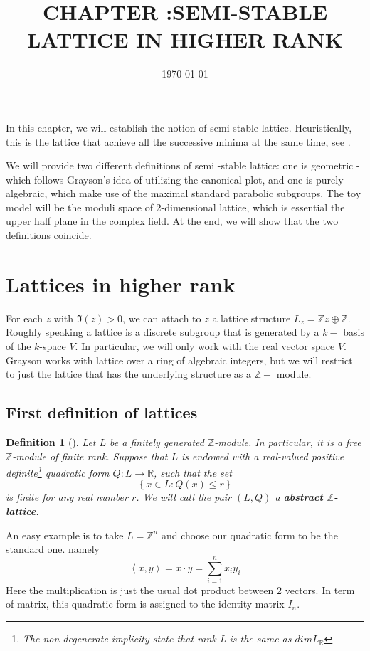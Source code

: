 \documentclass[12pt]{article} %
\title{CHAPTER  :SEMI-STABLE LATTICE IN HIGHER RANK} %
\date{\today} %
\newtheorem{definition}{Definition}[section]
\newcommand{\tpoint}[1]{\subsection{#1}}
\begin{document}
\maketitle %
In this chapter, we will establish the notion of semi-stable lattice. Heuristically,
this is the lattice that achieve all the successive minima at the same time, see \cite{}.

We will provide two different definitions of semi -stable lattice: one is geometric - which follows Grayson's idea of utilizing
the canonical plot, and one is purely algebraic, which make use of the maximal standard parabolic subgroups.
The toy model will be the moduli space of 2-dimensional lattice, which is essential the upper half plane in the complex field.
At the end, we will show that the two definitions coincide.
\section{Lattices in higher rank}
For each $z$ with $\Im(z)>0$, we can attach to $z$ a lattice structure $L_z = \mathbb{Z}z \oplus \mathbb{Z}$. Roughly speaking
a lattice is a discrete  subgroup that is generated by a $k-$ basis of the $k$-space $V$.
In particular, we will only work with the real vector space $V$. Grayson works with lattice over a ring of algebraic integers, but we will restrict to
just the lattice that has the underlying structure as a $\mathbb{Z}-$ module.

\tpoint{First definition of lattices}
\begin{definition}[\label = Abstract $\mathbb{Z}$-lattices]
    Let $L$ be a finitely generated $\mathbb{Z}$-module. In particular, it is a free $\mathbb{Z}$-module
    of finite rank. Suppose that $L$ is endowed with a real-valued  positive definite\footnote{The non-degenerate implicity state that rank L is the same as $dim L_\mathbb{R}$} quadratic form $Q\colon L \to \mathbb{R}$, such that the set
    \[\left\lbrace x \in L: Q(x) \le r\right\rbrace \]
    is finite for any real number $r$.
    We will call  the pair $(L,Q)$ a \textbf{abstract $\mathbb{Z}$-lattice}.
\end{definition}

An easy example is to take $L = \mathbb{Z}^n$ and choose our quadratic form to be the standard one. namely
\[\left\langle x,y \right\rangle = x \cdot y = \sum_{i=1}^n x_iy_i\]
Here the multiplication is just the usual dot product between 2 vectors. In term of matrix, this quadratic form is assigned to the
identity matrix $I_n$.
\end{document}
